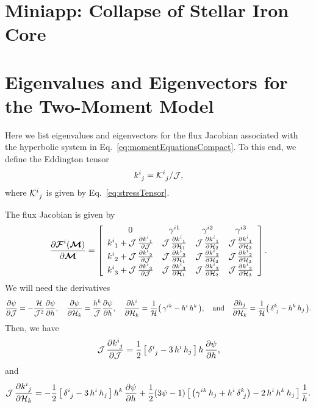\documentclass[10pt,preprint]{aastex}
\begin{document}
\section{Miniapp: Collapse of Stellar Iron Core}




\appendix

\clearpage

\section{Eigenvalues and Eigenvectors for the Two-Moment Model}
\label{sec:eigenstructure}

Here we list eigenvalues and eigenvectors for the flux Jacobian associated with the hyperbolic system in Eq.~\eqref{eq:momentEquationsCompact}.  
To this end, we define the Eddington tensor
\begin{equation}
  k^{i}_{~j}=\mathcal{K}^{i}_{~j}/\mathcal{J},
\end{equation}
where $\mathcal{K}^{i}_{~j}$ is given by Eq.~\eqref{eq:stressTensor}.  

The flux Jacobian is given by
\begin{equation}
  \frac{\partial \boldsymbol{\mathcal{F}}^{i}(\boldsymbol{\mathcal{M}})}{\partial \boldsymbol{\mathcal{M}}}
  =\left[
  \begin{array}{cccc}
    0 & \gamma^{i1} & \gamma^{i2} & \gamma^{i3} \\
    k^{i}_{~1}+\mathcal{J}\,\frac{\partial k^{i}_{~1}}{\partial \mathcal{J}} & \mathcal{J}\,\frac{\partial k^{i}_{~1}}{\partial \mathcal{H}_{1}} & \mathcal{J}\,\frac{\partial k^{i}_{~1}}{\partial \mathcal{H}_{2}} & \mathcal{J}\,\frac{\partial k^{i}_{~1}}{\partial \mathcal{H}_{3}} \\
    k^{i}_{~2}+\mathcal{J}\,\frac{\partial k^{i}_{~2}}{\partial \mathcal{J}} & \mathcal{J}\,\frac{\partial k^{i}_{~2}}{\partial \mathcal{H}_{1}} & \mathcal{J}\,\frac{\partial k^{i}_{~2}}{\partial \mathcal{H}_{2}} & \mathcal{J}\,\frac{\partial k^{i}_{~2}}{\partial \mathcal{H}_{3}} \\
    k^{i}_{~3}+\mathcal{J}\,\frac{\partial k^{i}_{~3}}{\partial \mathcal{J}} & \mathcal{J}\,\frac{\partial k^{i}_{~3}}{\partial \mathcal{H}_{1}} & \mathcal{J}\,\frac{\partial k^{i}_{~3}}{\partial \mathcal{H}_{2}} & \mathcal{J}\,\frac{\partial k^{i}_{~3}}{\partial \mathcal{H}_{3}}
  \end{array}
  \right].  
\end{equation}
We will need the derivatives
\begin{equation}
  \frac{\partial \psi}{\partial \mathcal{J}}=-\frac{\mathcal{H}}{\mathcal{J}^{2}}\frac{\partial \psi}{\partial h},
  \quad
  \frac{\partial \psi}{\partial \mathcal{H}_{k}}=\frac{h^{k}}{\mathcal{J}}\frac{\partial \psi}{\partial h},
  \quad
  \frac{\partial h^{i}}{\partial \mathcal{H}_{k}}
  =\frac{1}{\mathcal{H}}\big(\,\gamma^{ik}-h^{i}\,h^{k}\,\big),
  \quad\text{and}\quad
  \frac{\partial h_{j}}{\partial \mathcal{H}_{k}}
  =\frac{1}{\mathcal{H}}\big(\,\delta^{k}_{~j}-h^{k}\,h_{j}\,\big).
\end{equation}
Then, we have
\begin{equation}
  \mathcal{J}\,\frac{\partial k^{i}_{~j}}{\partial \mathcal{J}}
  =\frac{1}{2}\,\big[\,\delta^{i}_{~j}-3\,h^{i}\,h_{j}\,\big]\,h\,\frac{\partial \psi}{\partial h},
\end{equation}
and
\begin{equation}
  \mathcal{J}\,\frac{\partial k^{i}_{~j}}{\partial \mathcal{H}_{k}}
  =-\frac{1}{2}\,\big[\,\delta^{i}_{~j}-3\,h^{i}\,h_{j}\,\big]\,h^{k}\,\frac{\partial \psi}{\partial h}
  +\frac{1}{2}(3\psi-1)\,\big[\,\big(\gamma^{ik}\,h_{j}+h^{i}\,\delta^{k}_{~j}\big)-2\,h^{i}\,h^{k}\,h_{j}\,\big]\,\frac{1}{h}.  
\end{equation}
\end{document}
